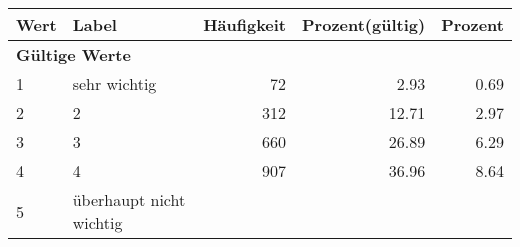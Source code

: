      \begin{longtable}{lXrrr}
     \toprule
     \textbf{Wert} & \textbf{Label} & \textbf{Häufigkeit} & \textbf{Prozent(gültig)} & \textbf{Prozent} \\
     \endhead
     \midrule
     \multicolumn{5}{l}{\textbf{Gültige Werte}}\\

     1 &
     \multicolumn{1}{X}{ sehr wichtig   } &


       \num{72} &
       \num[round-mode=places,round-precision=2]{2,93} &
         \num[round-mode=places,round-precision=2]{0,69} \\

     2 &
     \multicolumn{1}{X}{ 2   } &


       \num{312} &
       \num[round-mode=places,round-precision=2]{12,71} &
         \num[round-mode=places,round-precision=2]{2,97} \\

     3 &
     \multicolumn{1}{X}{ 3   } &


       \num{660} &
       \num[round-mode=places,round-precision=2]{26,89} &
         \num[round-mode=places,round-precision=2]{6,29} \\

     4 &
     \multicolumn{1}{X}{ 4   } &


       \num{907} &
       \num[round-mode=places,round-precision=2]{36,96} &
         \num[round-mode=places,round-precision=2]{8,64} \\

     5 &
     \multicolumn{1}{X}{ überhaupt nicht wichtig   } &



\end{longtable}
